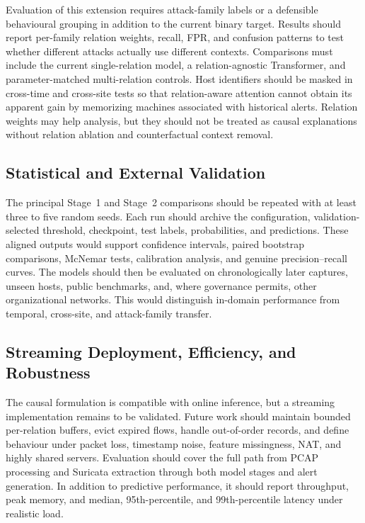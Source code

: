 Evaluation of this extension requires attack-family labels or a defensible
behavioural grouping in addition to the current binary target. Results should
report per-family relation weights, recall, FPR, and confusion patterns to test
whether different attacks actually use different contexts. Comparisons must
include the current single-relation model, a relation-agnostic Transformer, and
parameter-matched multi-relation controls. Host identifiers should be masked in
cross-time and cross-site tests so that relation-aware attention cannot obtain
its apparent gain by memorizing machines associated with historical alerts.
Relation weights may help analysis, but they should not be treated as causal
explanations without relation ablation and counterfactual context removal.

\subsection{Statistical and External Validation}
\label{subsubsec:future_validation}

The principal Stage~1 and Stage~2 comparisons should be repeated with at least
three to five random seeds. Each run should archive the configuration,
validation-selected threshold, checkpoint, test labels, probabilities, and
predictions. These aligned outputs would support confidence intervals, paired
bootstrap comparisons, McNemar tests, calibration analysis, and genuine
precision--recall curves. The models should then be evaluated on
chronologically later captures, unseen hosts, public benchmarks, and, where
governance permits, other organizational networks. This would distinguish
in-domain performance from temporal, cross-site, and attack-family transfer.

\subsection{Streaming Deployment, Efficiency, and Robustness}
\label{subsubsec:future_streaming_deployment}

The causal formulation is compatible with online inference, but a streaming
implementation remains to be validated. Future work should maintain bounded
per-relation buffers, evict expired flows, handle out-of-order records, and
define behaviour under packet loss, timestamp noise, feature missingness, NAT,
and highly shared servers. Evaluation should cover the full path from PCAP
processing and Suricata extraction through both model stages and alert
generation. In addition to predictive performance, it should report throughput,
peak memory, and median, 95th-percentile, and 99th-percentile latency under
realistic load.

